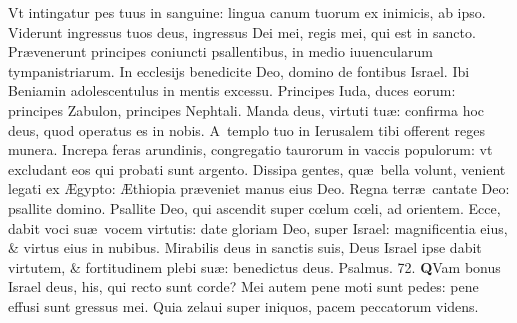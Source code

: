 \documentclass[a5paper,10pt]{book}
\def\ae{æ}
\def\AE{Æ}
\def\oe{œ}
\begin{document}
\begin{multicols*}{2}
\newline \color{red} V\color{black}t intingatur pes tuus in sanguine: lingua canum tuorum ex inimicis, ab ipso.
\newline \color{red} V\color{black}iderunt ingressus tuos deus, ingressus Dei mei, regis mei, qui est in sancto.
\newline \color{red} P\color{black}r\ae venerunt principes coniuncti psallentibus, in medio iuuencularum tympanistriarum.
\newline \color{red} I\color{black}n ecclesijs benedicite Deo, domino de fontibus Israel.
\newline \color{red} I\color{black}bi Beniamin adolescentulus in mentis excessu.
\newline \color{red} P\color{black}rincipes Iuda, duces eorum: principes Zabulon, principes Nephtali.
\newline \color{red} M\color{black}anda deus, virtuti tu\ae : confirma hoc deus, quod operatus es in nobis.
\newline \color{red} A\color{black}\ templo tuo in Ierusalem tibi offerent reges munera.
\newline \color{red} I\color{black}ncrepa feras arundinis, congregatio taurorum in vaccis populorum: vt excludant eos qui probati sunt argento.
\newline \color{red} D\color{black}issipa gentes, qu\ae \ bella volunt, venient legati ex \AE gypto: \AE thiopia pr\ae veniet manus eius Deo.
\newline \color{red} R\color{black}egna terr\ae \ cantate Deo: psallite domino.
\newline \color{red} P\color{black}sallite Deo, qui ascendit super c\oe lum c\oe li, ad orientem.
\newline \color{red} E\color{black}cce, dabit voci su\ae \ vocem virtutis: date gloriam Deo, super Israel: magnificentia eius, \& virtus eius in nubibus.
\newline \color{red} M\color{black}irabilis deus in sanctis suis, Deus Israel ipse dabit virtutem, \& fortitudinem plebi su\ae : benedictus deus.
\newline \color{red} Psalmus. \hypertarget{ps72}{72.} \color{black}%
\vspace{-.5em}
\lettrine[lines=2]{\bfseries \color{red} Q}{}Vam bonus Israel deus, his, qui recto sunt corde?
\newline \color{red} M\color{black}ei autem pene moti sunt pedes: pene effusi sunt gressus mei.
\newline \color{red} Q\color{black}uia zelaui super iniquos, pacem peccatorum videns.

\end{multicols*}
\end{document}
